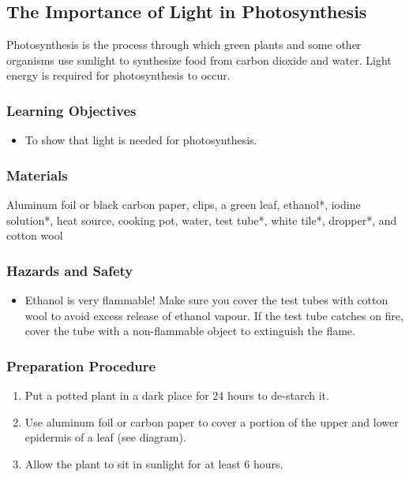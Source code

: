 \subsection{The Importance of Light in Photosynthesis}

Photosynthesis is the process through which green plants and some other organisms use sunlight to synthesize food from carbon dioxide and water. Light energy is required for photosynthesis to occur.

\subsubsection*{Learning Objectives}
\begin{itemize}
\item{To show that light is needed for photosynthesis.}
\end{itemize}

\subsubsection*{Materials}
Aluminum foil or black carbon paper, clips, a green leaf, ethanol*, iodine solution*, heat source, cooking pot, water, test tube*, white tile*, dropper*, and cotton wool

\subsubsection*{Hazards and Safety}
\begin{itemize}
\item{Ethanol is very flammable! Make sure you cover the test tubes with cotton wool to avoid excess release of ethanol vapour. If the test tube catches on fire, cover the tube with a non-flammable object to extinguish the flame.}
\end{itemize}

\subsubsection*{Preparation Procedure}
\begin{enumerate}
\item{Put a potted plant in a dark place for 24 hours to de-starch it.}
\item{Use aluminum foil or carbon paper to cover a portion of the upper and lower epidermis of a leaf (see diagram).}
\item{Allow the plant to sit in sunlight for at least 6 hours.}
\end{enumerate}

